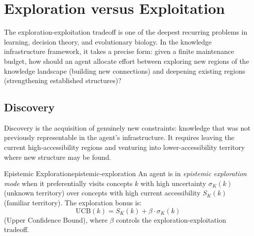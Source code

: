\chapter{Exploration versus Exploitation}



The exploration-exploitation tradeoff is one of the deepest recurring
problems in learning, decision theory, and evolutionary biology. In the
knowledge infrastructure framework, it takes a precise form: given a
finite maintenance budget, how should an agent allocate effort between
exploring new regions of the knowledge landscape (building new connections)
and deepening existing regions (strengthening established structures)?

\section{Discovery}

Discovery is the acquisition of genuinely new constraints: knowledge
that was not previously representable in the agent's infrastructure.
It requires leaving the current high-accessibility regions and venturing
into lower-accessibility territory where new structure may be found.

\begin{definition}{Epistemic Exploration}{epistemic-exploration}
  An agent is in \emph{epistemic exploration mode} when it preferentially
  visits concepts $k$ with high uncertainty $\sigma_K(k)$ (unknown
  territory) over concepts with high current accessibility $S_K(k)$
  (familiar territory). The exploration bonus is:
  \[
    \text{UCB}(k) = S_K(k) + \beta \cdot \sigma_K(k)
  \]
  (Upper Confidence Bound), where $\beta$ controls the
  exploration-exploitation tradeoff.
\end{definition}

